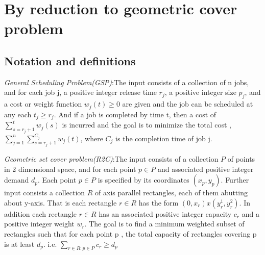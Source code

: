 \documentclass[11pt, a4paper, notitlepage, oneside]{article}
\begin{document}
{%

    
    
    
    
    
    
    
    
    
    
    
    
    
    
    
    
    
    
\section{By reduction to geometric cover problem \cite{bansal2010geometry} }

\subsection{Notation and definitions}

\textit{General Scheduling Problem(GSP)}:The input consists of a collection of n jobs, and for each job j, a positive integer release time $r_j$, a positive integer size $ p_j $, and a cost or weight function $w_j(t) \geq 0 $ are given and the job can be scheduled at any each $ t_j \geq r_j $. And if a job is completed by time t, then a cost of $  \sum_{s=r_j+1}^{t} w_j(s)  $ is incurred and the goal is to minimize the total cost , $ \sum_{j=1}^n \sum_{s=r_j+1}^{C_j} w_j(t)  $, where $ C_j $ is the completion time of job j. 

\textit{Geometric set cover problem(R2C)}:The input consists of a collection $P$ of points in 2 dimensional space, and for each point $ p \in P $ and associated positive integer demand $d_p$. Each point $p \in P $ is specified by its coordinates $(x_p,y_p)$. Further input consists a collection $R$ of axis parallel rectangles, each of them abutting about y-axis. That is each rectangle $r \in R$ has the form $ (0,x_r)x(y_r^1,y_r^2)  $. In addition each rectangle $r \in R$ has an associated positive integer capacity $c_r$  and a positive integer weight $w_r$. The goal is to find a minimum weighted subset of rectangles such that for each point p , the total capacity of rectangles covering p is at least $d_p$. i.e. $\sum_{r \in R: p \in P}c_r \geq d_p$


}
\end{document}
